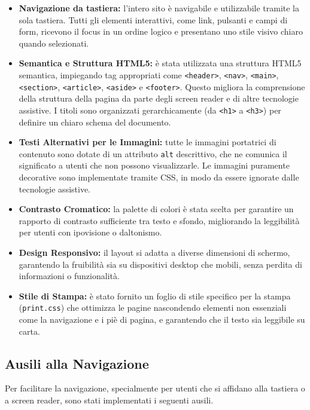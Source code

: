 \begin{itemize}
    \item \textbf{Navigazione da tastiera:} l'intero sito è navigabile e utilizzabile tramite la sola tastiera. Tutti gli elementi interattivi, come link, pulsanti e campi di form, ricevono il focus in un ordine logico e presentano uno stile visivo chiaro quando selezionati.
    
    \item \textbf{Semantica e Struttura HTML5:} è stata utilizzata una struttura HTML5 semantica, impiegando tag appropriati come \texttt{<header>}, \texttt{<nav>}, \texttt{<main>}, \texttt{<section>}, \texttt{<article>}, \texttt{<aside>} e \texttt{<footer>}. Questo migliora la comprensione della struttura della pagina da parte degli screen reader e di altre tecnologie assistive. I titoli sono organizzati gerarchicamente (da \texttt{<h1>} a \texttt{<h3>}) per definire un chiaro schema del documento.
    
    \item \textbf{Testi Alternativi per le Immagini:} tutte le immagini portatrici di contenuto sono dotate di un attributo \texttt{alt} descrittivo, che ne comunica il significato a utenti che non possono visualizzarle. Le immagini puramente decorative sono implementate tramite CSS, in modo da essere ignorate dalle tecnologie assistive.
    
    \item \textbf{Contrasto Cromatico:} la palette di colori è stata scelta per garantire un rapporto di contrasto sufficiente tra testo e sfondo, migliorando la leggibilità per utenti con ipovisione o daltonismo.
        
    \item \textbf{Design Responsivo:} il layout si adatta a diverse dimensioni di schermo, garantendo la fruibilità sia su dispositivi desktop che mobili, senza perdita di informazioni o funzionalità.

    \item \textbf{Stile di Stampa:} è stato fornito un foglio di stile specifico per la stampa (\texttt{print.css}) che ottimizza le pagine nascondendo elementi non essenziali come la navigazione e i piè di pagina, e garantendo che il testo sia leggibile su carta.
\end{itemize}

\subsection{Ausili alla Navigazione}
Per facilitare la navigazione, specialmente per utenti che si affidano alla tastiera o a screen reader, sono stati implementati i seguenti ausili.

